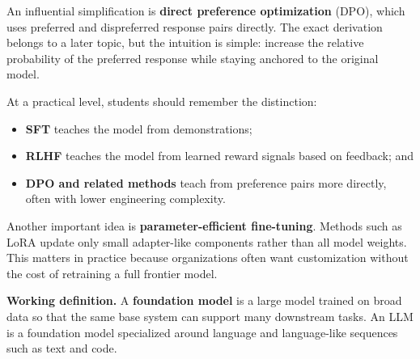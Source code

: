 \documentclass[12pt]{article}
\begin{document}
An influential simplification is \textbf{direct preference optimization} (DPO), which uses preferred and dispreferred response pairs directly. The exact derivation belongs to a later topic, but the intuition is simple: increase the relative probability of the preferred response while staying anchored to the original model.

At a practical level, students should remember the distinction:
\begin{itemize}
    \item \textbf{SFT} teaches the model from demonstrations;
    \item \textbf{RLHF} teaches the model from learned reward signals based on feedback; and
    \item \textbf{DPO and related methods} teach from preference pairs more directly, often with lower engineering complexity.
\end{itemize}

Another important idea is \textbf{parameter-efficient fine-tuning}. Methods such as LoRA update only small adapter-like components rather than all model weights. This matters in practice because organizations often want customization without the cost of retraining a full frontier model.

\begin{def-box}
\textbf{Working definition.} A \textbf{foundation model} is a large model trained on broad data so that the same base system can support many downstream tasks. An LLM is a foundation model specialized around language and language-like sequences such as text and code.
\end{def-box}
\end{document}
